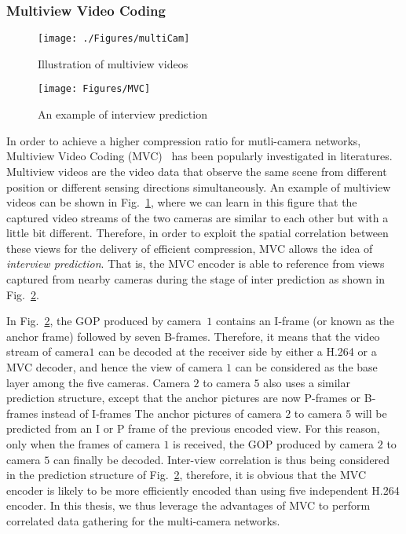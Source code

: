 \subsubsection{Multiview Video Coding}
\label{sec::MultiviewIntro}
%
\begin{figure}
\begin{center}
\texttt{[image: ./Figures/multiCam]}
\caption{\label{fig::multiCam}Illustration of multiview videos}
\end{center}
\end{figure}
%
\begin{figure}
\centering
\texttt{[image: Figures/MVC]}
\caption{An example of interview prediction~\cite{MVCoverview}\label{fig::MVC}}
\end{figure}
%
In order to achieve a higher compression ratio for mutli-camera networks, Multiview Video Coding (MVC)~\cite{MVCoverview} has been popularly investigated in literatures.
Multiview videos are the video data that observe the same scene from different position or different sensing directions simultaneously.
An example of multiview videos can be shown in Fig.~\ref{fig::multiCam}, where we can learn in this figure that the captured video streams of the two cameras are similar to each other but with a little bit different.
Therefore, in order to exploit the spatial correlation between these views for the delivery of efficient compression, MVC allows the idea of \emph{interview prediction}.
That is, the MVC encoder is able to reference from views captured from nearby cameras during the stage of inter prediction as shown in Fig.~\ref{fig::MVC}.

In Fig.~\ref{fig::MVC}, the GOP produced by camera~$1$ contains an I-frame (or known as the anchor frame) followed by seven B-frames.
Therefore, it means that the video stream of camera$1$ can be decoded at the receiver side by either a H.264 or a MVC decoder, and hence the view of camera $1$ can be considered as the base layer among the five cameras.
Camera $2$ to camera $5$ also uses a similar prediction structure, except that the anchor pictures are now P-frames or B-frames instead of I-frames
The anchor pictures of camera $2$ to camera $5$ will be predicted from an I or P frame of the previous encoded view.
For this reason, only when the frames of camera $1$ is received, the GOP produced by camera $2$ to camera $5$ can finally be decoded.
Inter-view correlation is thus being considered in the prediction structure of Fig.~\ref{fig::MVC}, therefore, it is obvious that the MVC encoder is likely to be more efficiently encoded than using five independent H.264 encoder.
In this thesis, we thus leverage the advantages of MVC to perform correlated data gathering for the multi-camera networks.
